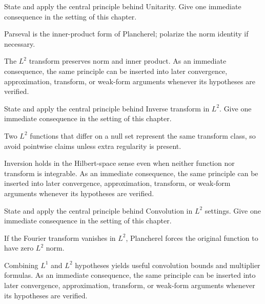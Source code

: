 \begin{exercise}\label{exr:iii13-03}
State and apply the central principle behind Unitarity. Give one immediate consequence in the setting of this chapter.
\end{exercise}
\begin{hint}
Parseval is the inner-product form of Plancherel; polarize the norm identity if necessary.
\end{hint}
\begin{solution}
The $L^2$ transform preserves norm and inner product. As an immediate consequence, the same principle can be inserted into later convergence, approximation, transform, or weak-form arguments whenever its hypotheses are verified.
\end{solution}

\begin{exercise}\label{exr:iii13-04}
State and apply the central principle behind Inverse transform in $L^2$. Give one immediate consequence in the setting of this chapter.
\end{exercise}
\begin{hint}
Two \(L^2\) functions that differ on a null set represent the same transform class, so avoid pointwise claims unless extra regularity is present.
\end{hint}
\begin{solution}
Inversion holds in the Hilbert-space sense even when neither function nor transform is integrable. As an immediate consequence, the same principle can be inserted into later convergence, approximation, transform, or weak-form arguments whenever its hypotheses are verified.
\end{solution}

\begin{exercise}\label{exr:iii13-05}
State and apply the central principle behind Convolution in $L^2$ settings. Give one immediate consequence in the setting of this chapter.
\end{exercise}
\begin{hint}
If the Fourier transform vanishes in \(L^2\), Plancherel forces the original function to have zero \(L^2\) norm.
\end{hint}
\begin{solution}
Combining $L^1$ and $L^2$ hypotheses yields useful convolution bounds and multiplier formulas. As an immediate consequence, the same principle can be inserted into later convergence, approximation, transform, or weak-form arguments whenever its hypotheses are verified.
\end{solution}

